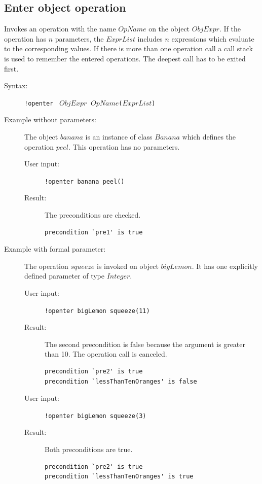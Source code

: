 \documentclass[a4paper,titlepage,oneside,final]{scrreprt} %
\begin{document}
\subsection{Enter object operation}\label{openterCmd}
Invokes an operation with the name $\mathit{OpName}$ on the object $\mathit{ObjExpr}$.
If the operation has $n$ parameters, the $\mathit{ExprList}$ includes $n$
expressions which evaluate to the corresponding values.
If there is more than one operation call a call stack is used to remember the
entered operations. The deepest call has to be exited first.
\begin{description}
\item[Syntax:] \verb+!openter + $\mathit{ObjExpr~}$ $\mathit{OpName}$\verb+(+$\mathit{ExprList}$\verb+)+
\item[Example without parameters:] The object $\mathit{banana}$ is an instance of class $\mathit{Banana}$ which
defines the operation $\mathit{peel}$. This operation has no parameters.
\begin{description}
\item[User input:] \verb+!openter banana peel()+
\item[Result:] The preconditions are checked.
\begin{verbatim}
precondition `pre1' is true
\end{verbatim}
\end{description}
\item[Example with formal parameter:] The operation $\mathit{squeeze}$ is invoked on
object $\mathit{bigLemon}$. It has one explicitly defined parameter of type $\mathit{Integer}$.
\begin{description}
\item[User input:] \verb+!openter bigLemon squeeze(11)+
\item[Result:] The second precondition is false because the argument is greater than
10. The operation call is canceled.
\begin{verbatim}
precondition `pre2' is true
precondition `lessThanTenOranges' is false
\end{verbatim}
\item[User input:] \verb+!openter bigLemon squeeze(3)+
\item[Result:] Both preconditions are true.
\begin{verbatim}
precondition `pre2' is true
precondition `lessThanTenOranges' is true
\end{verbatim}
\end{description}
\end{description}
\end{document}
